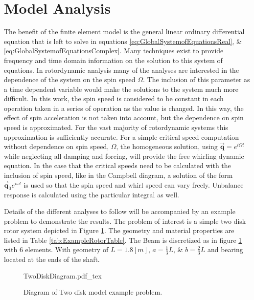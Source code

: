 \section{Model Analysis}\label{ModelAnalysis}
The benefit of the finite element model is the general linear ordinary differential equation that is left to solve in equations \eqref{eq:GlobalSystemofEquationsReal}, \& \eqref{eq:GlobalSystemofEquationsComplex}. Many techniques exist to provide frequency and time domain information on the solution to this system of equations. In rotordynamic analysis many of the analyses are interested in the dependence of the system on the spin speed $ \Omega $. The inclusion of this parameter as a time dependent variable would make the solutions to the system much more difficult. In this work, the spin speed is considered to be constant in each operation taken in a series of operation as the value is changed. In this way, the effect of spin acceleration is not taken into account, but the dependence on spin speed is approximated. For the vast majority of rotordynamic systems this approximation is sufficiently accurate.
For a simple critical speed computation without dependence on spin speed, $ \Omega $, the homogeneous solution, using $ \vec{\mathbf{q}}=e^{i\Omega t} $ while neglecting all damping and forcing, will provide the free whirling dynamic equation. In the case that the critical speeds need to be calculated with the inclusion of spin speed, like in the Campbell diagram, a solution of the form $  \vec{\mathbf{q}}_0e^{i\omega t}$ is used so that the spin speed and whirl speed can vary freely. Unbalance response is calculated using the particular integral as well.\par 
Details of the different analyses to follow will be accompanied by an example problem to demonstrate the results. The problem of interest is a simple two disk rotor system depicted in Figure \ref{fig:TwoDiskDiagram}. The geometry and material properties are listed in Table \ref{tab:ExampleRotorTable}. The Beam is discretized as in figure \ref{fig:TwoDiskDiagram} with 6 elements. With geometry of $ L=1.8[m] $, $ a=\frac{1}{3}L $, \& $ b=\frac{2}{3}L $ and bearing located at the ends of the shaft.\par 
\begin{figure}
	\centering
	\def\svgwidth{400pt}
	{TwoDiskDiagram.pdf_tex}
	\caption{Diagram of Two disk model example problem.}
	\label{fig:TwoDiskDiagram}
\end{figure}
